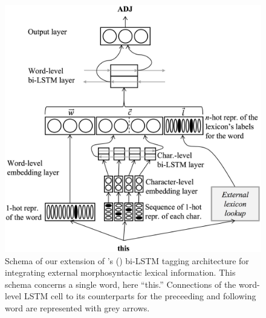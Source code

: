 \documentclass[11pt,a4paper]{article}
\begin{document}

\begin{figure}
\includegraphics[width=\columnwidth]{emnlp17schemaB2}
\caption{Schema of our extension of \citeauthor{plank16}'s (\citeyear{plank16})
  bi-LSTM tagging architecture for integrating external morphosyntactic lexical information. This schema concerns a
  single word, here ``this.'' Connections of the word-level LSTM cell to its counterparts for the preceeding and
  following word are represented with grey arrows.}\label{fig:schema}
\end{figure}
\end{document}
